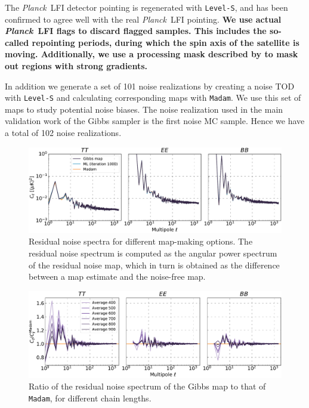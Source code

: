 \documentclass[twocolumn]{aa}
\newcommand{\Madam}{\texttt{Madam}}
\def\Planck{\textit{Planck}}
\begin{document}
The \Planck\ LFI detector pointing is regenerated with \texttt{Level-S}, and
has been confirmed to agree well with the real \Planck\ LFI pointing.
{\bf We use actual \Planck\ LFI flags to discard flagged
samples. This includes the so-called repointing periods, during which the spin
axis of the satellite is moving. Additionally, we use a processing mask 
described by \citet{bp01} to mask out regions with strong gradients.}

In addition we generate a set of 101 noise realizations by creating a
noise TOD with \texttt{Level-S} and calculating corresponding maps with
\Madam. We use this set of maps to study potential noise biases. The
noise realization used in the main validation work of the Gibbs
sampler is the first noise MC sample. Hence we have a total of 102
noise realizations.

\begin{figure}
  \center
  \includegraphics[width=18cm]{figs/Fig_residual_noise_spectrum.pdf}
  \caption{Residual noise spectra for different map-making options. 
  The residual noise spectrum is computed as the angular power spectrum of the residual noise map, which in turn is obtained
   as the difference between a map estimate and the noise-free map.}\label{fig:resnoise_comparison}
\end{figure}


\begin{figure}
  \center
  \includegraphics[width=18cm]{figs/Fig_residual_noise_spectrum_ratio_SamplingOn.pdf}
  \caption{Ratio of the residual noise spectrum of the Gibbs map to that of \Madam, for different chain lengths.  }\label{fig:resnoise_SamplingOn}
\end{figure}
\end{document}
